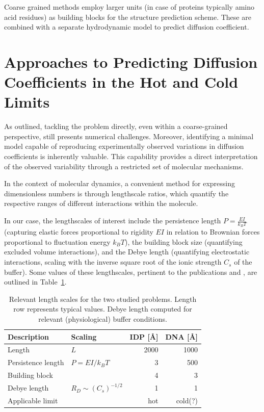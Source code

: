\documentclass{doctoral}
\begin{document}
Coarse grained methods employ larger units (in case of proteins typically amino acid residues) as building blocks for the structure prediction scheme.
These are combined with a separate hydrodynamic model to predict diffusion coefficient.

\section{Approaches to Predicting Diffusion Coefficients in the Hot and Cold Limits}

As outlined, tackling the problem directly, even within a coarse-grained perspective, still presents numerical challenges.
Moreover, identifying a minimal model capable of reproducing experimentally observed variations in diffusion coefficients is inherently valuable.
This capability provides a direct interpretation of the observed variability through a restricted set of molecular mechanisms.

In the context of molecular dynamics, a convenient method for expressing dimensionless numbers is through lengthscale ratios, which quantify the respective ranges of different interactions within the molecule.

In our case, the lengthscales of interest include the persistence length $P = \frac{EI}{k_B T}$ (capturing elastic forces proportional to rigidity $EI$ in relation to Brownian forces proportional to fluctuation energy $k_B T$), the building block size (quantifying excluded volume interactions), and the Debye length (quantifying electrostatic interactions, scaling with the inverse square root of the ionic strength $C_s$ of the buffer).
Some values of these lengthscales, pertinent to the publications \cite{Waszkiewicz_2023_dna} and \cite{Waszkiewicz_2024_mda}, are outlined in Table~\ref{tab:lengthscales}.

\begin{table}[htbp]
    \centering
    \begin{tabular}{llrr}
        \toprule
        \textbf{Description} &
        \textbf{Scaling}     &
        \textbf{IDP [\AA]}   &
        \textbf{DNA [\AA]}                                              \\
        \midrule
        Length               & $L$                     & 2000 & 1000    \\
        Persistence length   & $P = EI / k_B T$        & 3    & 500     \\
        Building block       &                         & 4    & 3       \\
        Debye length         & $R_D \sim (C_s)^{-1/2}$ & 1    & 1       \\
        \midrule
        Applicable limit     &                         & hot  & cold(?) \\
        \bottomrule
    \end{tabular}
    \caption{Relevant length scales for the two studied problems.
        Length row represents typical values.
        Debye length computed for relevant (physiological) buffer conditions.
    } \label{tab:lengthscales}
\end{table}
\end{document}
